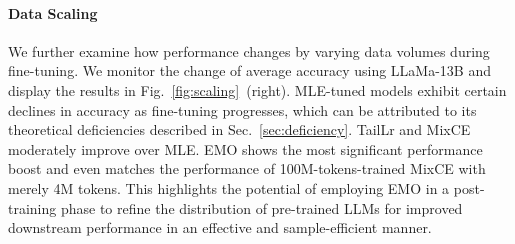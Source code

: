 \paragraph{Data Scaling} We further examine how performance changes by varying data volumes during fine-tuning. We monitor the change of average accuracy using LLaMa-13B and display the results in Fig.~\ref{fig:scaling}~(right).  
MLE-tuned models exhibit certain declines in accuracy as fine-tuning progresses, which can be attributed to its theoretical deficiencies described in Sec.~\ref{sec:deficiency}. TailLr and MixCE moderately improve over MLE. EMO shows the most significant performance boost and even matches the performance of 100M-tokens-trained MixCE with merely 4M tokens. This highlights the potential of employing EMO in a post-training phase to refine the distribution of pre-trained LLMs for improved downstream performance in an effective and sample-efficient manner.
\label{sec:nlu}